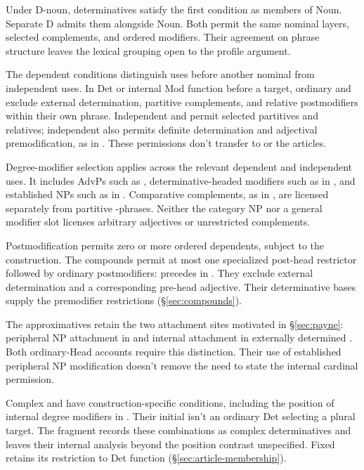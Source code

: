 \documentclass[12pt]{article}
\begin{document}
Under D-noun, determinatives satisfy the first condition as members of Noun. Separate D admits them alongside Noun. Both permit the same nominal layers, selected complements, and ordered modifiers. Their agreement on phrase structure leaves the lexical grouping open to the profile argument.

The dependent conditions distinguish uses before another nominal from independent uses. In Det or internal Mod function before a target, ordinary  and  exclude external determination, partitive complements, and relative postmodifiers within their own phrase. Independent  and  permit selected partitives and relatives; independent  also permits definite determination and adjectival premodification, as in . These permissions don't transfer to  or the articles.

Degree-modifier selection applies across the relevant dependent and independent uses. It includes AdvPs such as , determinative-headed modifiers such as  in , and established NPs such as  in . Comparative complements, as in , are licensed separately from partitive -phrases. Neither the category NP nor a general modifier slot licenses arbitrary adjectives or unrestricted complements.

Postmodification permits zero or more ordered dependents, subject to the construction. The compounds permit at most one specialized post-head restrictor followed by ordinary postmodifiers:  precedes  in . They exclude external determination and a corresponding pre-head adjective. Their determinative bases supply the premodifier restrictions (§\ref{sec:compounds}).

The approximatives retain the two attachment sites motivated in §\ref{sec:payne}: peripheral NP attachment in  and internal attachment in externally determined . Both ordinary-Head accounts require this distinction. Their use of established peripheral NP modification doesn't remove the need to state the internal cardinal permission.

Complex  and  have construction-specific conditions, including the position of internal degree modifiers in . Their initial  isn't an ordinary Det selecting a plural  target. The fragment records these combinations as complex determinatives and leaves their internal analysis beyond the position contrast unspecified. Fixed  retains its restriction to Det function (§\ref{sec:article-membership}).
\end{document}
